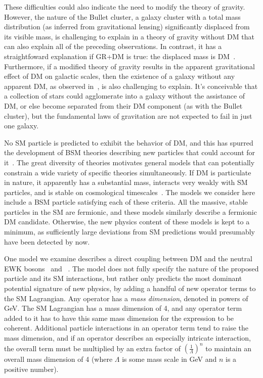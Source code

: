 \documentclass[oneside, letterpaper, 12pt, oldfontcommands]{memoir}
\begin{document}
These difficulties could also indicate the need to modify the theory of gravity.
However, the nature of the Bullet cluster, a galaxy cluster with a total mass distribution (as inferred from gravitational lensing) significantly displaced from its visible mass,
is challenging to explain in a theory of gravity without DM that can also explain all of the preceding observations.
In contrast, it has a straightfoward explanation if GR+DM is true: the displaced mass is DM~\cite{ref:508162}. Furthermore, if a modified theory of gravity
results in the apparent gravitational effect of DM on galactic scales, then the existence of a galaxy without any apparent DM, as observed in~\cite{ref:nature25767}, is
also challenging to explain. It's conceivable that a collection of stars could agglomerate into a galaxy without the assistance of DM, or else become separated from their
DM component (as with the Bullet cluster), but the fundamental laws of gravitation are not expected to fail in just one galaxy.

No SM particle is predicted to exhibit the behavior of DM, and this has spurred the development
of BSM theories describing new particles that could account for it~\cite{ref:s41550-017-0059, ref:j.physrep.2004.08.031, ref:annurev.nucl.54.070103.181244, ref:S1062798717000783}.
The great diversity of theories motivates general models that can potentially constrain a wide variety of specific theories simultaneously.
If DM is particulate in nature, it apparently has a substantial mass, interacts very weakly with SM particles, and is stable on cosmological timescales~\cite{}.
The models we consider here include a BSM particle satisfying each of these criteria.
All the massive, stable particles in the SM are fermionic, and these models similarly describe a fermionic DM candidate. Otherwise, the new physics
content of these models is kept to a minimum, as sufficiently large deviations from SM predictions would presumably have been detected by now.

One model we examine describes a direct coupling between DM and the neutral EWK bosons \PZ\ and \Pgamma~\cite{ref:PhysRevD.89.056011}. The model does not fully specify
the nature of the proposed particle and its SM interactions, but rather only predicts the most dominant potential signature of new physics,
by adding a handful of new operator terms to the SM Lagrangian. Any operator has a \textit{mass dimension}, denoted in powers of GeV. The SM Lagrangian has
a mass dimension of 4, and any operator term added to it has to have this same mass dimension for the expression to be coherent.
Additional particle interactions in an operator term tend to raise the mass dimension, and if an operator describes an especially intricate interaction,
the overall term must be multiplied by an extra factor of $(\frac{1}{\Lambda})^{n}$ to maintain an overall mass dimension of 4 (where $\Lambda$ is some mass
scale in GeV and $n$ is a positive number).
\end{document}
